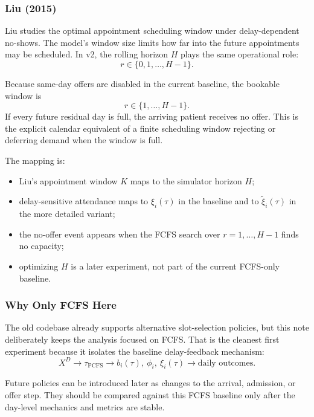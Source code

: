 \documentclass[11pt]{article}
\begin{document}
\subsubsection{Liu (2015)}

Liu studies the optimal appointment scheduling window under delay-dependent no-shows. The model's
window size limits how far into the future appointments may be scheduled. In v2, the rolling
horizon \(H\) plays the same operational role:
\[
r\in\{0,1,\dots,H-1\}.
\]

Because same-day offers are disabled in the current baseline, the bookable window is
\[
r\in\{1,\dots,H-1\}.
\]
If every future residual day is full, the arriving patient receives no offer. This is the explicit
calendar equivalent of a finite scheduling window rejecting or deferring demand when the window is
full.

The mapping is:
\begin{itemize}[nosep]
    \item Liu's appointment window \(K\) maps to the simulator horizon \(H\);
    \item delay-sensitive attendance maps to \(\xi_i(\tau)\) in the baseline and to \(\tilde{\xi}_i(\tau)\) in the more detailed variant;
    \item the no-offer event appears when the FCFS search over \(r=1,\dots,H-1\) finds no capacity;
    \item optimizing \(H\) is a later experiment, not part of the current FCFS-only baseline.
\end{itemize}

\subsubsection{Why Only FCFS Here}

The old codebase already supports alternative slot-selection policies, but this note deliberately
keeps the analysis focused on FCFS. That is the cleanest first experiment because it isolates the
baseline delay-feedback mechanism:
\[
X^D
\rightarrow
\tau_{\mathrm{FCFS}}
\rightarrow
b_i(\tau),\ \phi_i,\ \xi_i(\tau)
\rightarrow
\text{daily outcomes}.
\]

Future policies can be introduced later as changes to the arrival, admission, or offer step. They
should be compared against this FCFS baseline only after the day-level mechanics and metrics are
stable.
\end{document}
